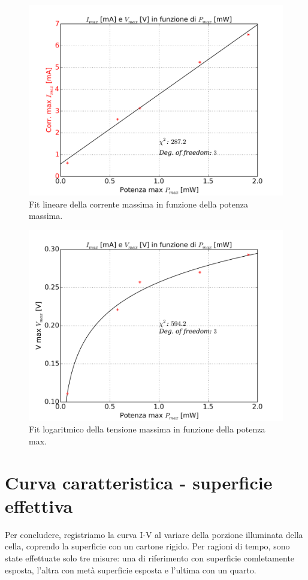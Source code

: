 \documentclass[journal, a4paper]{IEEEtran}
\begin{document}
\begin{figure}
\centering
\includegraphics[width=0.8\linewidth]{./es8_fit_corr}
\caption{Fit lineare della corrente massima in funzione della potenza massima.}
\label{fig:es8_fit_corr}
\end{figure}

\begin{figure}
\centering
\includegraphics[width=0.8\linewidth]{./es8_fit_tens}
\caption{Fit logaritmico della tensione massima in funzione della potenza max.}
\label{fig:es8_fit_tens}
\end{figure}


\section{Curva caratteristica - superficie effettiva}
Per concludere, registriamo la curva I-V al variare della porzione illuminata della cella, coprendo la superficie con un cartone rigido. Per ragioni di tempo, sono state effettuate solo tre misure: una di riferimento con superficie comletamente esposta, l'altra con metà superficie esposta e l'ultima con un quarto.\\
\end{document}
